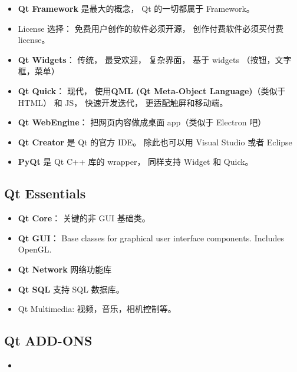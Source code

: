 
\begin{issues}
\issueDraft
\end{issues}

\begin{itemize}
\item \textbf{Qt Framework} 是最大的概念， Qt 的一切都属于 Framework。
\item License 选择： 免费用户创作的软件必须开源， 创作付费软件必须买付费 license。
\item \textbf{Qt Widgets}： 传统， 最受欢迎， 复杂界面， 基于 widgets （按钮，文字框，菜单）
\item \textbf{Qt Quick}： 现代， 使用\textbf{QML (Qt Meta-Object Language)}（类似于 HTML） 和 JS， 快速开发迭代， 更适配触屏和移动端。
\item \textbf{Qt WebEngine}： 把网页内容做成桌面 app（类似于 Electron 吧）
\item \textbf{Qt Creator} 是 Qt 的官方 IDE。 除此也可以用 Visual Studio 或者 Eclipse
\item \textbf{PyQt} 是 Qt C++ 库的 wrapper， 同样支持 Widget 和 Quick。
\end{itemize}

\subsection{Qt Essentials}
\begin{itemize}
\item \textbf{Qt Core}： 关键的非 GUI 基础类。
\item \textbf{Qt GUI}： Base classes for graphical user interface components. Includes OpenGL.
\item \textbf{Qt Network} 网络功能库
\item \textbf{Qt SQL} 支持 SQL 数据库。
\item Qt Multimedia: 视频，音乐，相机控制等。
\end{itemize}

\subsection{Qt ADD-ONS}
\begin{itemize}
\item 
\end{itemize}
